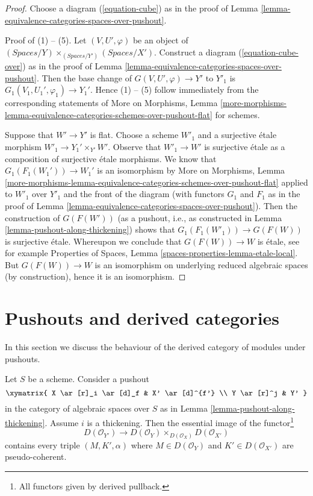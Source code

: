 \begin{proof}
Choose a diagram (\ref{equation-cube}) as in the proof of
Lemma \ref{lemma-equivalence-categories-spaces-over-pushout}.

\medskip\noindent
Proof of (1) -- (5). Let $(V, U', \varphi)$ be an object of
$(\textit{Spaces}/Y) \times_{(\textit{Spaces}/Y')} (\textit{Spaces}/X')$.
Construct a diagram (\ref{equation-cube-over}) as in the proof of
Lemma \ref{lemma-equivalence-categories-spaces-over-pushout}.
Then the base change of $G(V, U', \varphi) \to Y'$ to
$Y'_1$ is $G_1(V_1, U_1', \varphi_1) \to Y_1'$. Hence (1) -- (5)
follow immediately from the corresponding statements of
More on Morphisms, Lemma
\ref{more-morphisms-lemma-equivalence-categories-schemes-over-pushout-flat}
for schemes.

\medskip\noindent
Suppose that $W' \to Y'$ is flat. Choose a scheme $W'_1$ and a surjective
\'etale morphism $W'_1 \to Y_1' \times_{Y'} W'$. Observe that $W'_1 \to W'$
is surjective \'etale as a composition of surjective \'etale morphisms. We
know that $G_1(F_1(W_1')) \to W_1'$ is an isomorphism by
More on Morphisms, Lemma
\ref{more-morphisms-lemma-equivalence-categories-schemes-over-pushout-flat}
applied to $W'_1$ over $Y'_1$ and the front of the diagram (with functors
$G_1$ and $F_1$ as in the proof of
Lemma \ref{lemma-equivalence-categories-spaces-over-pushout}).
Then the construction of $G(F(W'))$ (as a pushout, i.e.,
as constructed in Lemma \ref{lemma-pushout-along-thickening}) shows that
$G_1(F_1(W'_1)) \to G(F(W))$ is surjective \'etale. Whereupon we conclude
that $G(F(W)) \to W$ is \'etale, see for example
Properties of Spaces, Lemma \ref{spaces-properties-lemma-etale-local}.
But $G(F(W)) \to W$ is an isomorphism on underlying reduced
algebraic spaces (by construction), hence it is an isomorphism.
\end{proof}









\section{Pushouts and derived categories}
\label{section-pushouts-derived}

\noindent
In this section we discuss the behaviour of the derived
category of modules under pushouts.

\begin{lemma}
\label{lemma-pushout-along-thickening-derived}
Let $S$ be a scheme. Consider a pushout
$$
\xymatrix{
X \ar[r]_i \ar[d]_f & X' \ar[d]^{f'}
\\
Y \ar[r]^j & Y'
}
$$
in the category of algebraic spaces over $S$
as in Lemma \ref{lemma-pushout-along-thickening}.
Assume $i$ is a thickening. Then the essential
image of the functor\footnote{All functors given by derived pullback.}
$$
D(\mathcal{O}_{Y'}) \longrightarrow
D(\mathcal{O}_Y) \times_{D(\mathcal{O}_X)} D(\mathcal{O}_{X'})
$$
contains every triple $(M, K', \alpha)$ where $M \in D(\mathcal{O}_Y)$
and $K' \in D(\mathcal{O}_{X'})$ are pseudo-coherent.
\end{lemma}

